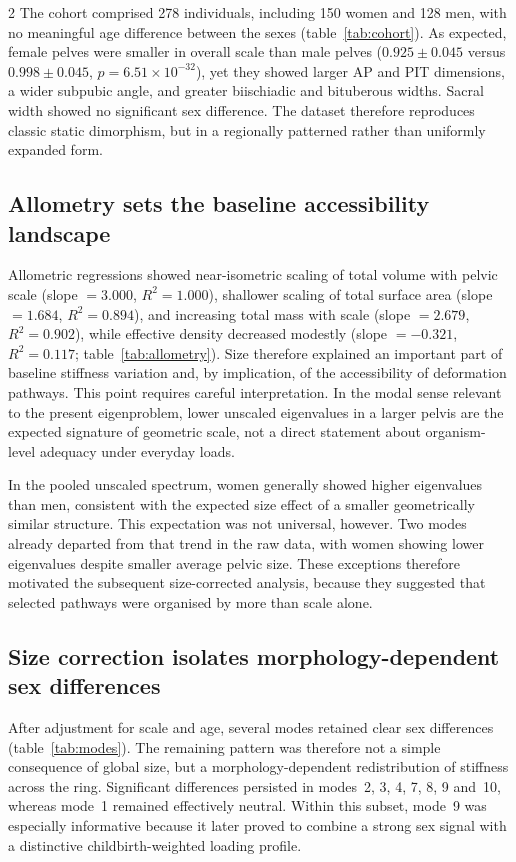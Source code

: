 \documentclass[openacc]{rsproca_new}
\begin{document}
\begin{multicols}{2}
The cohort comprised 278 individuals, including 150 women and 128 men, with no meaningful age difference between the sexes (table~\ref{tab:cohort}). As expected, female pelves were smaller in overall scale than male pelves ($0.925 \pm 0.045$ versus $0.998 \pm 0.045$, $p=6.51 \times 10^{-32}$), yet they showed larger AP and PIT dimensions, a wider subpubic angle, and greater biischiadic and bituberous widths. Sacral width showed no significant sex difference. The dataset therefore reproduces classic static dimorphism, but in a regionally patterned rather than uniformly expanded form.

\subsection{Allometry sets the baseline accessibility landscape}

Allometric regressions showed near-isometric scaling of total volume with pelvic scale (slope $=3.000$, $R^2=1.000$), shallower scaling of total surface area (slope $=1.684$, $R^2=0.894$), and increasing total mass with scale (slope $=2.679$, $R^2=0.902$), while effective density decreased modestly (slope $=-0.321$, $R^2=0.117$; table~\ref{tab:allometry}). Size therefore explained an important part of baseline stiffness variation and, by implication, of the accessibility of deformation pathways. This point requires careful interpretation. In the modal sense relevant to the present eigenproblem, lower unscaled eigenvalues in a larger pelvis are the expected signature of geometric scale, not a direct statement about organism-level adequacy under everyday loads.

In the pooled unscaled spectrum, women generally showed higher eigenvalues than men, consistent with the expected size effect of a smaller geometrically similar structure. This expectation was not universal, however. Two modes already departed from that trend in the raw data, with women showing lower eigenvalues despite smaller average pelvic size. These exceptions therefore motivated the subsequent size-corrected analysis, because they suggested that selected pathways were organised by more than scale alone.

\subsection{Size correction isolates morphology-dependent sex differences}

After adjustment for scale and age, several modes retained clear sex differences (table~\ref{tab:modes}). The remaining pattern was therefore not a simple consequence of global size, but a morphology-dependent redistribution of stiffness across the ring. Significant differences persisted in modes~2, 3, 4, 7, 8, 9 and~10, whereas mode~1 remained effectively neutral. Within this subset, mode~9 was especially informative because it later proved to combine a strong sex signal with a distinctive childbirth-weighted loading profile.


\end{multicols}
\end{document}
